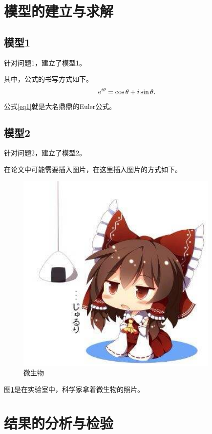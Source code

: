 \documentclass[12pt, a4paper, oneside]{ctexart}
\begin{document}
    \section{模型的建立与求解}

    \subsection{模型1}

    针对问题1，建立了模型1。

    其中，公式的书写方式如下。
    \begin{equation}
        \label{eq1}
        {\rm{e}}^{i\theta}=\cos\theta+i\sin\theta.
    \end{equation}
    公式\ref{eq1}就是大名鼎鼎的Euler公式。

    \subsection{模型2}

    针对问题2，建立了模型2。

    在论文中可能需要插入图片，在这里插入图片的方式如下。

    \begin{figure}[htbp]
        \centering
        \includegraphics[width=10cm]{灵梦.jpeg}
        \caption{微生物}\label{fig1}
    \end{figure}

    图\ref{fig1}是在实验室中，科学家拿着微生物的照片。

    \section{结果的分析与检验}
\end{document}
